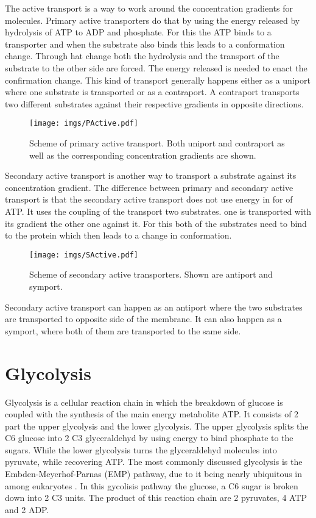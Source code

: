 The active transport is a way to work around the concentration gradients for molecules. Primary active transporters do that by using the energy released by hydrolysis of ATP to ADP and phosphate. For this the ATP binds to a transporter and when the substrate also binds this leads to a conformation change. Through hat change both the hydrolysis and the transport of the substrate to the other side are forced. The energy released is needed to enact the confirmation change. 
This kind of transport generally happens either as a uniport where one substrate is transported or as a contraport. A contraport transports two different substrates against their respective gradients in opposite directions.

\begin{figure}[H]
    \centering
    \texttt{[image: imgs/PActive.pdf]}
    \caption{Scheme of primary active transport. Both uniport and contraport as well as the corresponding concentration gradients are shown.}
    \label{fig:PActive}
\end{figure}

Secondary active transport is another way to transport a substrate against its concentration gradient. The difference between primary and secondary active transport is that the secondary active transport does not use energy in for of ATP. It uses the coupling of the transport two substrates. one is transported with its gradient the other one against it. For this both of the substrates need to bind to the protein which then leads to a change in conformation. 

\begin{figure}[H]
    \centering
    \texttt{[image: imgs/SActive.pdf]}
    \caption{Scheme of secondary active transporters. Shown are antiport and symport.}
    \label{fig:SActive}
\end{figure}

Secondary active transport can happen as an antiport where the two substrates are transported to opposite side of the membrane. It can also happen as a symport, where both of them are transported to the same side. 

\section{Glycolysis}
Glycolysis is a cellular reaction chain in which the breakdown of glucose is coupled with the synthesis of the main energy metabolite ATP.
It consists of 2 part the upper glycolysis and the lower glycolysis. The upper glycolysis splits the C6 glucose into 2 C3 glyceraldehyd by using energy to bind phosphate to the 
sugars. While the lower glycolysis turns the glyceraldehyd molecules into pyruvate, while recovering ATP.
The most commonly discussed glycolysis is the Embden-Meyerhof-Parnas (EMP) pathway, due to it being nearly ubiquitous in among eukaryotes \cite{flamholz2012glycotic}.
In this gycolisis pathway the glucose, a C6 sugar is broken down into 2 C3 units. The product of this reaction chain are 2 pyruvates, 4 ATP and 2 ADP. 

